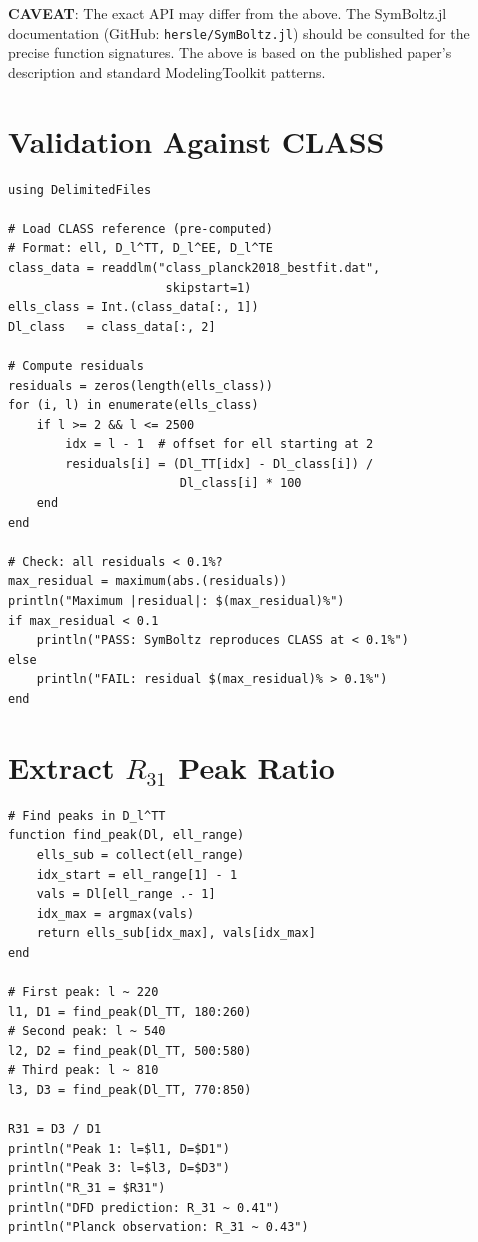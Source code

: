 \documentclass[11pt,a4paper]{article}
\begin{document}
\textbf{CAVEAT}: The exact API may differ from the above. The SymBoltz.jl documentation (GitHub: \texttt{hersle/SymBoltz.jl}) should be consulted for the precise function signatures. The above is based on the published paper's description and standard ModelingToolkit patterns.

\section{Validation Against CLASS}

\begin{lstlisting}[caption={Validation: Compare SymBoltz vs CLASS}]
using DelimitedFiles

# Load CLASS reference (pre-computed)
# Format: ell, D_l^TT, D_l^EE, D_l^TE
class_data = readdlm("class_planck2018_bestfit.dat",
                      skipstart=1)
ells_class = Int.(class_data[:, 1])
Dl_class   = class_data[:, 2]

# Compute residuals
residuals = zeros(length(ells_class))
for (i, l) in enumerate(ells_class)
    if l >= 2 && l <= 2500
        idx = l - 1  # offset for ell starting at 2
        residuals[i] = (Dl_TT[idx] - Dl_class[i]) /
                        Dl_class[i] * 100
    end
end

# Check: all residuals < 0.1%?
max_residual = maximum(abs.(residuals))
println("Maximum |residual|: $(max_residual)%")
if max_residual < 0.1
    println("PASS: SymBoltz reproduces CLASS at < 0.1%")
else
    println("FAIL: residual $(max_residual)% > 0.1%")
end
\end{lstlisting}

\section{Extract $R_{31}$ Peak Ratio}

\begin{lstlisting}[caption={Extract third-to-first peak ratio}]
# Find peaks in D_l^TT
function find_peak(Dl, ell_range)
    ells_sub = collect(ell_range)
    idx_start = ell_range[1] - 1
    vals = Dl[ell_range .- 1]
    idx_max = argmax(vals)
    return ells_sub[idx_max], vals[idx_max]
end

# First peak: l ~ 220
l1, D1 = find_peak(Dl_TT, 180:260)
# Second peak: l ~ 540
l2, D2 = find_peak(Dl_TT, 500:580)
# Third peak: l ~ 810
l3, D3 = find_peak(Dl_TT, 770:850)

R31 = D3 / D1
println("Peak 1: l=$l1, D=$D1")
println("Peak 3: l=$l3, D=$D3")
println("R_31 = $R31")
println("DFD prediction: R_31 ~ 0.41")
println("Planck observation: R_31 ~ 0.43")
\end{lstlisting}
\end{document}
